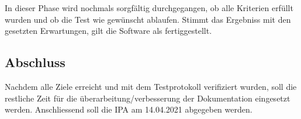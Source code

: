 In dieser Phase wird nochmals sorgfältig durchgegangen, ob alle Kriterien erfüllt wurden und ob die Test wie gewünscht ablaufen. Stimmt das Ergebniss mit den gesetzten Erwartungen, gilt die Software als fertiggestellt.

\subsection{Abschluss}

Nachdem alle Ziele erreicht und mit dem Testprotokoll verifiziert wurden, soll die restliche Zeit für die überarbeitung/verbesserung der Dokumentation eingesetzt werden. Anschliessend soll die IPA am 14.04.2021 abgegeben werden.